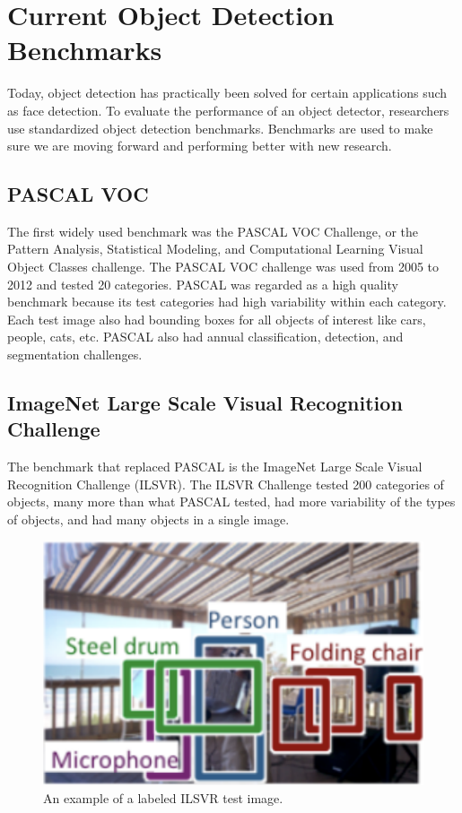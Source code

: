 \documentclass{article}
\begin{document}
\section{Current Object Detection Benchmarks}
Today, object detection has practically been solved for certain applications such as face detection. To evaluate the performance of an object detector, researchers use standardized object detection benchmarks. Benchmarks are used to make sure we are moving forward and performing better with new research.

\subsection{PASCAL VOC} 
The first widely used benchmark was the PASCAL VOC Challenge, or the Pattern Analysis, Statistical Modeling, and Computational Learning Visual Object Classes challenge. The PASCAL VOC challenge was used from 2005 to 2012 and tested 20 categories. PASCAL was regarded as a high quality benchmark because its test categories had high variability within each category. Each test image also had bounding boxes for all objects of interest like cars, people, cats, etc. PASCAL also had annual classification, detection, and segmentation challenges.

\subsection{ImageNet Large Scale Visual Recognition Challenge}
The benchmark that replaced PASCAL is the ImageNet Large Scale Visual Recognition Challenge (ILSVR). The ILSVR Challenge tested 200 categories of objects, many more than what PASCAL tested, had more variability of the types of objects, and had many objects in a single image.

\begin{figure}[h]
	\includegraphics[width=\textwidth]{ilsvr.png}
    \caption{An example of a labeled ILSVR test image.}
\end{figure}
\end{document}
